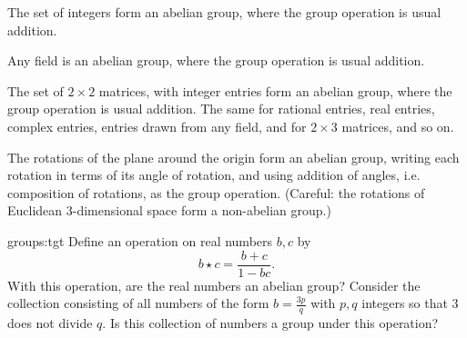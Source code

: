 \begin{example}
The set of integers form an abelian group, where the group operation is usual addition.
\end{example}
\begin{example}
Any field is an abelian  group, where the group operation is usual addition.
\end{example}
\begin{example}
The set of \(2 \times 2\) matrices, with integer entries form an abelian  group, where the group operation is usual addition.
The same for rational entries, real entries, complex entries, entries drawn from any field, and for \(2 \times 3\) matrices, and so on.
\end{example}
\begin{example}
The rotations of the plane around the origin form an abelian group, writing each rotation in terms of its angle of rotation, and using addition of angles, i.e. composition of rotations, as the group operation.
(Careful: the rotations of Euclidean 3-dimensional space form a non-abelian group.)
\end{example}


\begin{problem}{groups:tgt}
Define an operation on real numbers \(b,c\) by
\[
b \star c = \frac{b+c}{1-bc}.
\]
With this operation, are the real numbers an abelian group?
Consider the collection consisting of all numbers of the form \(b=\frac{3p}{q}\) with \(p, q\) integers so that \(3\) does not divide \(q\).
Is this collection of numbers a group under this operation?
\end{problem}


